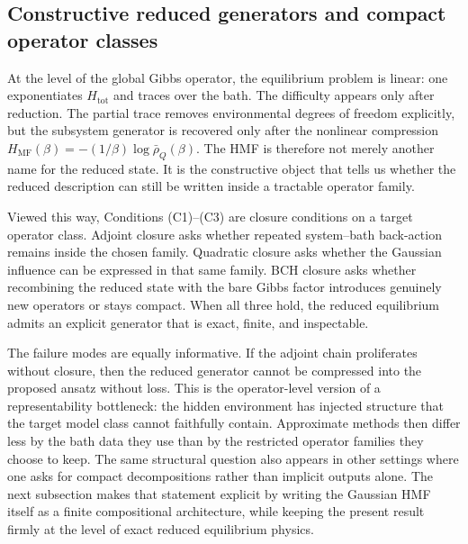 \subsection{Constructive reduced generators and compact operator classes}
\label{subsec:constructive_bridge}

At the level of the global Gibbs operator, the equilibrium problem is linear:
one exponentiates $H_{\mathrm{tot}}$ and traces over the bath. The difficulty
appears only after reduction. The partial trace removes environmental degrees
of freedom explicitly, but the subsystem generator is recovered only after the
nonlinear compression
$H_{\mathrm{MF}}(\beta)=-(1/\beta)\log\bar\rho_Q(\beta)$. The HMF is therefore
not merely another name for the reduced state. It is the constructive object
that tells us whether the reduced description can still be written inside a
tractable operator family.

Viewed this way, Conditions (C1)--(C3) are closure conditions on a target
operator class. Adjoint closure asks whether repeated system--bath back-action
remains inside the chosen family. Quadratic closure asks whether the Gaussian
influence can be expressed in that same family. BCH closure asks whether
recombining the reduced state with the bare Gibbs factor introduces genuinely
new operators or stays compact. When all three hold, the reduced equilibrium
admits an explicit generator that is exact, finite, and inspectable.

The failure modes are equally informative. If the adjoint chain proliferates
without closure, then the reduced generator cannot be compressed into the
proposed ansatz without loss. This is the operator-level version of a
representability bottleneck: the hidden environment has injected structure that
the target model class cannot faithfully contain. Approximate methods then
differ less by the bath data they use than by the restricted operator families
they choose to keep.
The same structural question also appears in other settings where one asks for
compact decompositions rather than implicit outputs alone. The next subsection
makes that statement explicit by writing the Gaussian HMF itself as a finite
compositional architecture, while keeping the present result firmly at the
level of exact reduced equilibrium physics.
